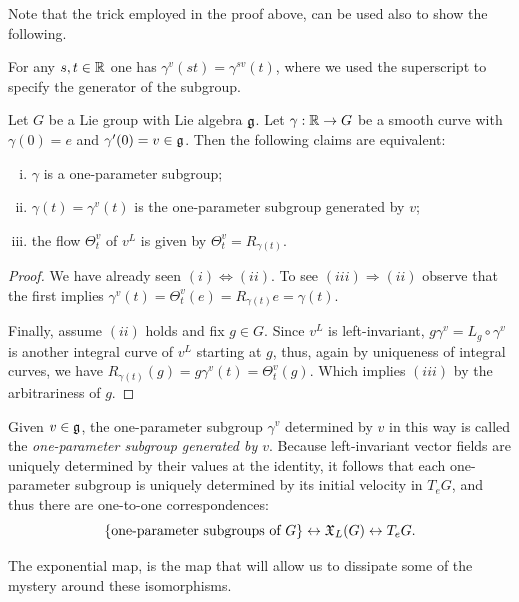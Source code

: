 Note that the trick employed in the proof above, can be used also to show the following.
\begin{lemma}
	For any $s,t\in\mathbb{R}$ one has $\gamma^v(st) = \gamma^{sv}(t)$, where we used the superscript to specify the generator of the subgroup.
\end{lemma}

\begin{proposition}\label{prop:liflow}
	Let $G$ be a Lie group with Lie algebra $\mathfrak{g}$.
	Let $\gamma:\mathbb{R}\to G$ be a smooth curve with $\gamma(0)=e$ and $\gamma'(0)=v\in\mathfrak{g}$. Then the following claims are equivalent:
	\begin{enumerate}[(i)]
		\item $\gamma$ is a one-parameter subgroup;
		\item $\gamma(t) = \gamma^v(t)$ is the one-parameter subgroup generated by $v$;
		\item the flow $\Theta_t^v$ of $v^L$ is given by $\Theta_t^v = R_{\gamma(t)}$.
	\end{enumerate}
\end{proposition}
\begin{proof}
	We have already seen $(i) \Leftrightarrow (ii)$.
	To see $(iii)\Rightarrow(ii)$ observe that the first implies $\gamma^v(t) = \Theta_t^v(e) = R_{\gamma(t)}e = \gamma(t)$.

	Finally, assume $(ii)$ holds and fix $g\in G$.
	Since $v^L$ is left-invariant, $g\gamma^v = L_g \circ \gamma^v$ is another integral curve of $v^L$ starting at $g$, thus, again by uniqueness of integral curves, we have $R_{\gamma(t)}(g) = g\gamma^v(t) = \Theta_t^v(g)$. Which implies $(iii)$ by the arbitrariness of $g$.
\end{proof}

Given $v\in\mathfrak{g}$, the one-parameter subgroup $\gamma^v$ determined by $v$ in this way is called the \emph{one-parameter subgroup generated by $v$}.
Because left-invariant vector fields are uniquely determined by their values at the identity, it follows that each one-parameter subgroup is uniquely determined by its initial velocity in $T_eG$, and thus there are one-to-one correspondences:
\begin{equation}
	\{\mbox{one-parameter subgroups of }G\}
	\leftrightarrow
	\mathfrak{X}_L(G)
	\leftrightarrow
	T_e G.
\end{equation}

The exponential map, is the map that will allow us to dissipate some of the mystery around these isomorphisms.

